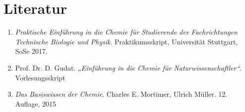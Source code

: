 \documentclass{scrartcl}
\begin{document}
\section{Literatur}
\begin{enumerate}[label=(\arabic*)]
	\item \emph{Praktische Einführung in die Chemie
für Studierende der Fachrichtungen
Technische Biologie und Physik}. Praktikumsskript, Universität Stuttgart,
SoSe 2017.  
	\item Prof. Dr. D. Gudat. \emph{„Einführung in die Chemie für Naturwissenschaftler“}. Vorlesungsskript
	\item \emph{Das Basiswissen der Chemie}. Charles E. Mortimer, Ulrich Müller. 12. Auflage, 2015
\end{enumerate}
\end{document}
